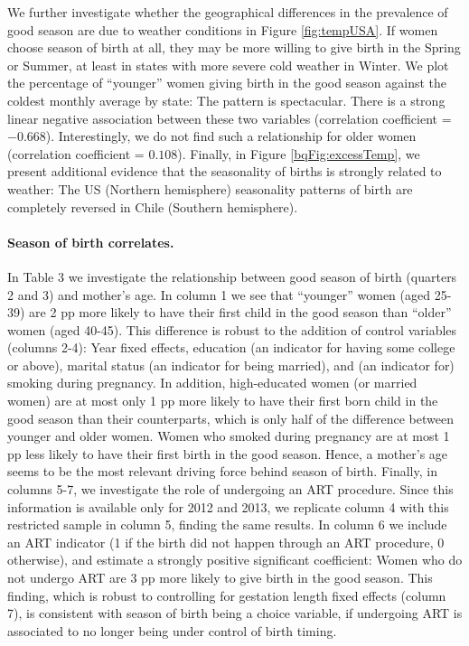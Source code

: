 \documentclass[a4paper, 12 pt]{article}
\theoremstyle{plain}
\begin{document}
\begin{doublespace}
We further investigate whether the geographical differences in the prevalence of good season are due to weather conditions in Figure \ref{fig:tempUSA}. If women choose season of birth at all, they may be more willing to give birth in the Spring or Summer, at least in states with more severe cold weather in Winter. We plot the percentage of ``younger'' women giving birth in the good season against the coldest monthly average by state: The pattern is spectacular. There is a strong linear negative association between these two variables (correlation coefficient = $-0.668$). Interestingly, we do not find such a relationship for older women (correlation coefficient = $0.108$). Finally, in Figure \ref{bqFig:excessTemp}, we present additional evidence that the seasonality of births is strongly related to weather: The US (Northern hemisphere) seasonality patterns of birth are completely reversed in Chile (Southern hemisphere).


\paragraph{Season of birth correlates.} In Table 3 we investigate the relationship between good season of birth (quarters 2 and 3) and mother's age. In column 1 we see that ``younger'' women (aged 25-39) are 2 pp more likely to have their first child in the good season than ``older'' women (aged 40-45). This difference is robust to the addition of control variables (columns 2-4): Year fixed effects, education (an indicator for having some college or above), marital status (an indicator for being married), and (an indicator for) smoking during pregnancy. In addition, high-educated women (or married women) are at most only 1 pp more likely to have their first born child in the good season than their counterparts, which is only half of the difference between younger and older women. Women who smoked during pregnancy are at most 1 pp less likely to have their first birth in the good season. Hence, a mother's age seems to be the most relevant driving force behind season of birth. Finally, in columns 5-7, we investigate the role of undergoing an ART procedure. Since this information is available only for 2012 and 2013, we replicate column 4 with this restricted sample in column 5, finding the same results. In column 6 we include an ART indicator (1 if the birth did not happen through an ART procedure, 0 otherwise), and estimate a strongly positive significant coefficient: Women who do not undergo ART are 3 pp more likely to give birth in the good season. This finding, which is robust to controlling for gestation length fixed effects (column 7), is consistent with season of birth being a choice variable, if undergoing ART is associated to no longer being under control of birth timing.%



\end{doublespace}
\end{document}

